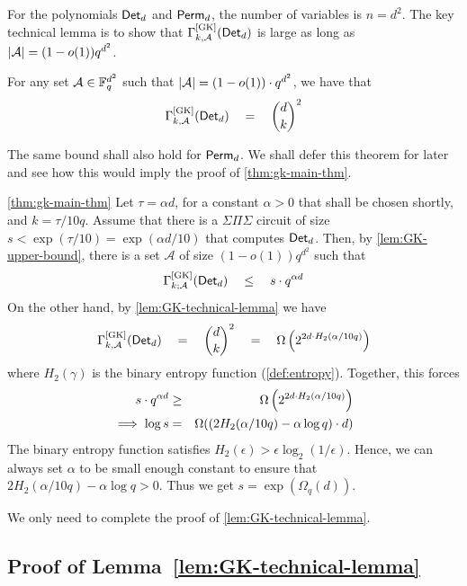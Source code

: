 For the polynomials $\operatorname{\mathsf{Det}}_d$ and $\operatorname{\mathsf{Perm}}_d$, the number of variables is $n = d^2$. 
The key technical lemma is to show that
$\Gamma^{\mathrm{[GK]}}_{k,\mathcal{A}}(\operatorname{\mathsf{Det}}_d)$ is large as long as
$\left|\mathcal{A}\right| = (1 - o(1)) q^{d^2}$.

\begin{lemma}\label{lem:GK-technical-lemma}
  For any set $\mathcal{A} \in \mathbb{F}_q^{d^2}$ such that
  $\left|\mathcal{A}\right| = (1 - o(1)) \cdot q^{d^2}$, we have that
  \[
  \Gamma^{\mathrm{[GK]}}_{k,\mathcal{A}}(\operatorname{\mathsf{Det}}_d) \quad = \quad  \binom{d}{k}^2
  \]
\end{lemma}

The same bound shall also hold for $\operatorname{\mathsf{Perm}}_d$. 
We shall defer this
theorem for later and see how this would imply the proof of
\autoref{thm:gk-main-thm}.

\begin{proofof}{\autoref{thm:gk-main-thm}}
  Let $\tau = \alpha d$, for a constant $\alpha > 0$ that shall be chosen shortly,  and $k = \tau/10q$. 
  Assume that there is a $\Sigma\Pi\Sigma$ circuit of size  $s < \exp(\tau/10) = \exp(\alpha d / 10)$ that computes $\operatorname{\mathsf{Det}}_d$. 
  Then, by \autoref{lem:GK-upper-bound}, there is a set $\mathcal{A}$ of size $(1 - o(1)) q^{d^2}$ such that 
  \[
  \Gamma^{\mathrm{[GK]}}_{k;\mathcal{A}}(\operatorname{\mathsf{Det}}_d) \quad \leq \quad s \cdot  q^{\alpha d}
  \]
  On the other hand, by \autoref{lem:GK-technical-lemma} we have
  \[
  \Gamma^{\mathrm{[GK]}}_{k,\mathcal{A}}(\operatorname{\mathsf{Det}}_d) \quad = \quad  \binom{d}{k}^2 \quad = \quad \Omega\left(2^{2d \cdot H_2(\alpha/10q)}\right)
  \]
  where $H_2(\gamma)$ is the binary entropy function (\autoref{def:entropy}). 
  Together, this forces 
  \begin{eqnarray*}
    s \cdot q^{\alpha d}  & \geq & \Omega\left(2^{2d \cdot H_2(\alpha/10q)}\right)\\
    \implies \log s & = & \Omega((2H_2(\alpha/10q) - \alpha \log q) \cdot d)
  \end{eqnarray*}
  The binary entropy function satisfies $H_2(\epsilon) > \epsilon \log_2(1/\epsilon)$. Hence, we can always set $\alpha$ to be small enough constant to ensure that $2H_2(\alpha/10q) - \alpha \log q > 0$. 
Thus we get $s =  \exp(\Omega_q(d))$. 
\end{proofof}

\noindent
We only need to complete the proof of \autoref{lem:GK-technical-lemma}. 

\subsection{Proof of Lemma~\ref{lem:GK-technical-lemma} {} }

